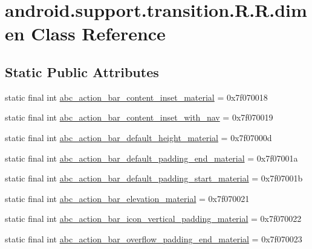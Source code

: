 \hypertarget{classandroid_1_1support_1_1transition_1_1_r_1_1dimen}{
\section{android.support.transition.R.R.dimen Class Reference}
\label{classandroid_1_1support_1_1transition_1_1_r_1_1dimen}
}
\subsection*{Static Public Attributes}
\begin{CompactItemize}
\item 
static final int \hyperlink{classandroid_1_1support_1_1transition_1_1_r_1_1dimen_454a64f0132082e39b17afb2741caa8a}{abc\_\-action\_\-bar\_\-content\_\-inset\_\-material} = 0x7f070018
\item 
static final int \hyperlink{classandroid_1_1support_1_1transition_1_1_r_1_1dimen_20cbe26f62ea640792aae1b47e21afc3}{abc\_\-action\_\-bar\_\-content\_\-inset\_\-with\_\-nav} = 0x7f070019
\item 
static final int \hyperlink{classandroid_1_1support_1_1transition_1_1_r_1_1dimen_f322878580ae7881db066b9d874990e4}{abc\_\-action\_\-bar\_\-default\_\-height\_\-material} = 0x7f07000d
\item 
static final int \hyperlink{classandroid_1_1support_1_1transition_1_1_r_1_1dimen_eb8f1155c3e465233171a304a873da6a}{abc\_\-action\_\-bar\_\-default\_\-padding\_\-end\_\-material} = 0x7f07001a
\item 
static final int \hyperlink{classandroid_1_1support_1_1transition_1_1_r_1_1dimen_ea820bf05b0596e7b3dd47611d3929cf}{abc\_\-action\_\-bar\_\-default\_\-padding\_\-start\_\-material} = 0x7f07001b
\item 
static final int \hyperlink{classandroid_1_1support_1_1transition_1_1_r_1_1dimen_7b6dbceae43b05bae2e4a5c100e55815}{abc\_\-action\_\-bar\_\-elevation\_\-material} = 0x7f070021
\item 
static final int \hyperlink{classandroid_1_1support_1_1transition_1_1_r_1_1dimen_7af8de397f20db425bec08b3e20ccd38}{abc\_\-action\_\-bar\_\-icon\_\-vertical\_\-padding\_\-material} = 0x7f070022
\item 
static final int \hyperlink{classandroid_1_1support_1_1transition_1_1_r_1_1dimen_1b1029f5c0e3db2501840ce312c64b2c}{abc\_\-action\_\-bar\_\-overflow\_\-padding\_\-end\_\-material} = 0x7f070023
\item 

\end{CompactItemize}
